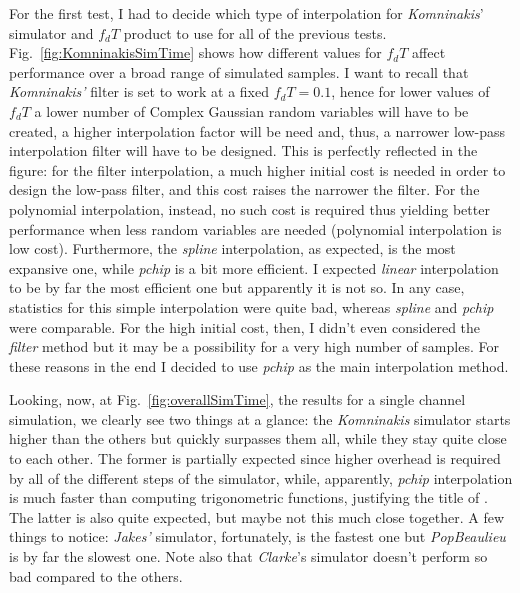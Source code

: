 For the first test, I had to decide which type of interpolation for \textit{Komninakis}' simulator and $f_dT$ product to use for all of the previous tests. Fig.~\ref{fig:KomninakisSimTime} shows how different values for $f_dT$ affect performance over a broad range of simulated samples. I want to recall that \textit{Komninakis'} filter is set to work at a fixed $f_dT=0.1$, hence for lower values of $f_dT$ a lower number of Complex Gaussian random variables will have to be created, a higher interpolation factor will be need and, thus, a narrower low-pass interpolation filter will have to be designed. This is perfectly reflected in the figure: for the filter interpolation, a much higher initial cost is needed in order to design the low-pass filter, and this cost raises the narrower the filter. For the polynomial interpolation, instead, no such cost is required thus yielding better performance when less random variables are needed (polynomial interpolation is low cost). Furthermore, the \textit{spline} interpolation, as expected, is the most expansive one, while \textit{pchip} is a bit more efficient. I expected \textit{linear} interpolation to be by far the most efficient one but apparently it is not so. In any case, statistics for this simple interpolation were quite bad, whereas \textit{spline} and \textit{pchip} were comparable. For the high initial cost, then, I didn't even considered the \textit{filter} method but it may be a possibility for a very high number of samples. For these reasons in the end I decided to use \textit{pchip} as the main interpolation method.

Looking, now, at Fig.~\ref{fig:overallSimTime}, the results for a single channel simulation, we clearly see two things at a glance: the \textit{Komninakis} simulator starts higher than the others but quickly surpasses them all, while they stay quite close to each other. The former is partially expected since higher overhead is required by all of the different steps of the simulator, while, apparently, \textit{pchip} interpolation is much faster than computing trigonometric functions, justifying the title of \cite{A3}. The latter is also quite expected, but maybe not this much close together. A few things to notice: \textit{Jakes'} simulator, fortunately, is the fastest one but \textit{PopBeaulieu} is by far the slowest one. Note also that \textit{Clarke}'s simulator doesn't perform so bad compared to the others.

